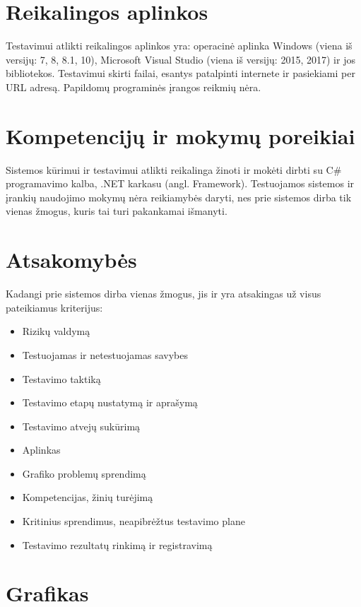 \section{Reikalingos aplinkos}

Testavimui atlikti reikalingos aplinkos yra: operacinė aplinka Windows (viena iš versijų: 7, 8, 8.1, 10), Microsoft Visual Studio (viena iš versijų: 2015, 2017) ir jos bibliotekos. 
Testavimui skirti failai, esantys patalpinti internete ir pasiekiami per URL adresą. 
Papildomų programinės įrangos reikmių nėra.

\section{Kompetencijų ir mokymų poreikiai}

Sistemos kūrimui ir testavimui atlikti reikalinga žinoti ir mokėti dirbti su C\# programavimo kalba, .NET karkasu (angl. Framework). 
Testuojamos sistemos ir įrankių naudojimo mokymų nėra reikiamybės daryti, nes prie sistemos dirba tik vienas žmogus, kuris tai turi pakankamai išmanyti.

\section{Atsakomybės}

Kadangi prie sistemos dirba vienas žmogus, jis ir yra atsakingas už visus pateikiamus kriterijus: 

\begin{itemize}
	\item Rizikų valdymą
	\item Testuojamas ir netestuojamas savybes
	\item Testavimo taktiką
	\item Testavimo etapų nustatymą ir aprašymą
	\item Testavimo atvejų sukūrimą
	\item Aplinkas
	\item Grafiko problemų sprendimą
	\item Kompetencijas, žinių turėjimą
	\item Kritinius sprendimus, neapibrėžtus testavimo plane
	\item Testavimo rezultatų rinkimą ir registravimą
\end{itemize}

\section{Grafikas}

